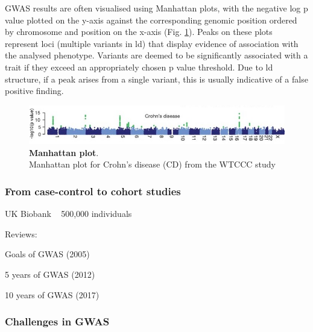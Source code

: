 GWAS results are often visualised using Manhattan plots, with the negative log p value plotted on the y-axis against the corresponding genomic position ordered by chromosome and position on the x-axis (Fig. \ref{fig:manhattan}). 
Peaks on these plots represent loci (multiple variants in \gls{ld}) that display evidence of association with the analysed phenotype. 
Variants are deemed to be significantly associated with a trait if they exceed an appropriately chosen p value threshold. 
Due to \gls{ld} structure, if a peak arises from a single variant, this is usually indicative of a false positive finding.

\begin{figure}[h]
\centering
\includegraphics[width=15cm]{Chapter1/Fig/Manhattan_plots_CD_WTCCC_2007.jpg}
\caption[Manhattan plot]{\textbf{Manhattan plot}.\\
Manhattan plot for Crohn's disease (CD) from the WTCCC study \cite{wellcome2007genome}}
\label{fig:manhattan}
\end{figure}

\subsubsection{From case-control to cohort studies}

UK Biobank ~ 500,000 individuals \cite{bycroft2018uk}



Reviews:

Goals of GWAS (2005) \cite{hirschhorn2005genome}

5 years of GWAS (2012) \cite{visscher2012five}

10 years of GWAS (2017) \cite{visscher201710}

\subsubsection{Challenges in GWAS}




